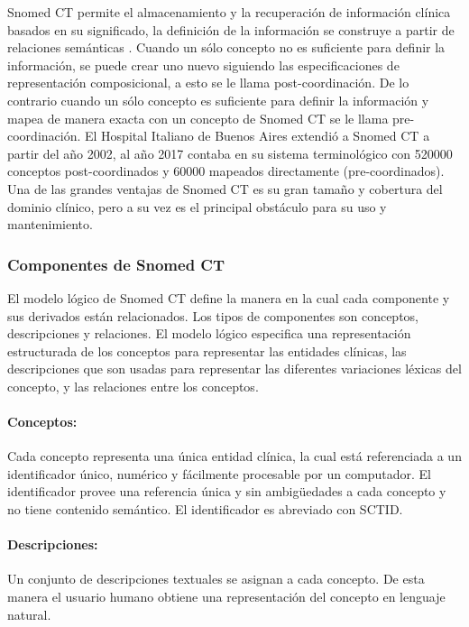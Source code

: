 Snomed CT permite el almacenamiento y la recuperación de información clínica basados en su significado, la definición de la información se construye a partir de relaciones semánticas \cite{Rector,Bhattacharyya2016,ihtsdo2016SG}. Cuando un sólo concepto no es suficiente para definir la información, se puede crear uno nuevo siguiendo las especificaciones de representación composicional, a esto se le llama post-coordinación. De lo contrario cuando un sólo concepto es suficiente para definir la información y mapea de manera exacta con un concepto de Snomed CT se le llama pre-coordinación. El Hospital Italiano de Buenos Aires extendió a Snomed CT a partir del año 2002, al año \num{2017} contaba en su sistema terminológico con \num{520000} conceptos post-coordinados y \num{60000} mapeados directamente (pre-coordinados). Una de las grandes ventajas de Snomed CT es su gran tamaño y cobertura del dominio clínico, pero a su vez es el principal obstáculo para su uso y mantenimiento.

\subsubsection{Componentes de Snomed CT}
El modelo lógico de Snomed CT define la manera en la cual cada componente  y sus derivados están relacionados. Los tipos de componentes son conceptos, descripciones y relaciones. El modelo lógico especifica una representación estructurada de los conceptos para representar las entidades clínicas, las descripciones  que son usadas para representar las diferentes variaciones léxicas del concepto, y las relaciones entre los conceptos.\cite{ihtsdo2016SG}

\paragraph{Conceptos:}
Cada concepto representa una única entidad clínica, la cual está referenciada a un identificador único, numérico y fácilmente procesable por un computador. El identificador provee una referencia única y sin ambigüedades a cada concepto y no tiene contenido semántico. El identificador es abreviado con SCTID.\cite{ihtsdo2016SG}

\paragraph{Descripciones:}
Un conjunto de descripciones textuales se asignan a cada concepto. De esta manera el usuario humano obtiene una representación del concepto en lenguaje natural.

